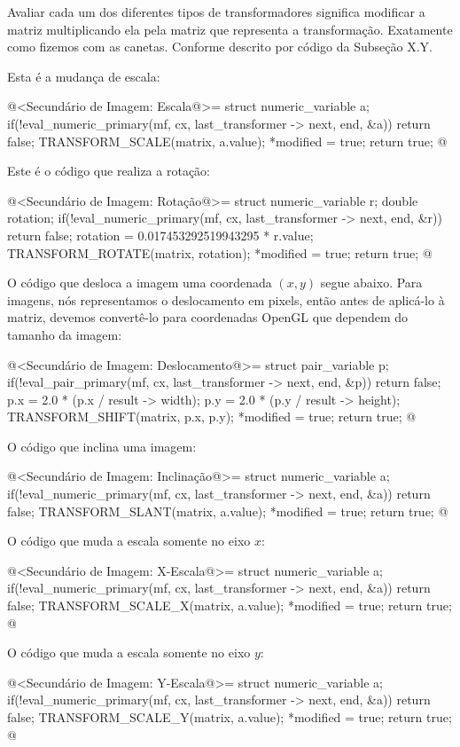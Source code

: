 {{{{{{Avaliar cada um dos diferentes tipos de transformadores significa
modificar a matriz multiplicando ela pela matriz que representa a
transformação. Exatamente como fizemos com as canetas. Conforme
descrito por código da Subseção X.Y.

Esta é a mudança de escala:

\iniciocodigo
@<Secundário de Imagem: Escala@>=
struct numeric_variable a;
if(!eval_numeric_primary(mf, cx, last_transformer -> next, end, &a))
  return false;
TRANSFORM_SCALE(matrix, a.value);
*modified = true;
return true;
@
\fimcodigo

Este é o código que realiza a rotação:

\iniciocodigo
@<Secundário de Imagem: Rotação@>=
struct numeric_variable r;
double rotation;
if(!eval_numeric_primary(mf, cx, last_transformer -> next, end, &r))
  return false;
rotation = 0.017453292519943295 * r.value;
TRANSFORM_ROTATE(matrix, rotation);
*modified = true;
return true;
@
\fimcodigo

O código que desloca a imagem uma coordenada $(x, y)$ segue
abaixo. Para imagens, nós representamos o deslocamento em pixels,
então antes de aplicá-lo à matriz, devemos convertê-lo para
coordenadas OpenGL que dependem do tamanho da imagem:

\iniciocodigo
@<Secundário de Imagem: Deslocamento@>=
struct pair_variable p;
if(!eval_pair_primary(mf, cx, last_transformer -> next, end, &p))
  return false;
p.x = 2.0 * (p.x / result -> width);
p.y = 2.0 * (p.y / result -> height);
TRANSFORM_SHIFT(matrix, p.x, p.y);
*modified = true;
return true;
@
\fimcodigo

O código que inclina uma imagem:

\iniciocodigo
@<Secundário de Imagem: Inclinação@>=
struct numeric_variable a;
if(!eval_numeric_primary(mf, cx, last_transformer -> next, end, &a))
  return false;
TRANSFORM_SLANT(matrix, a.value);
*modified = true;
return true;
@
\fimcodigo

O código que muda a escala somente no eixo $x$:

\iniciocodigo
@<Secundário de Imagem: X-Escala@>=
struct numeric_variable a;
if(!eval_numeric_primary(mf, cx, last_transformer -> next, end, &a))
  return false;
TRANSFORM_SCALE_X(matrix, a.value);
*modified = true;
return true;
@
\fimcodigo

O código que muda a escala somente no eixo $y$:

\iniciocodigo
@<Secundário de Imagem: Y-Escala@>=
struct numeric_variable a;
if(!eval_numeric_primary(mf, cx, last_transformer -> next, end, &a))
  return false;
TRANSFORM_SCALE_Y(matrix, a.value);
*modified = true;
return true;
@
\fimcodigo

}}}}}}
